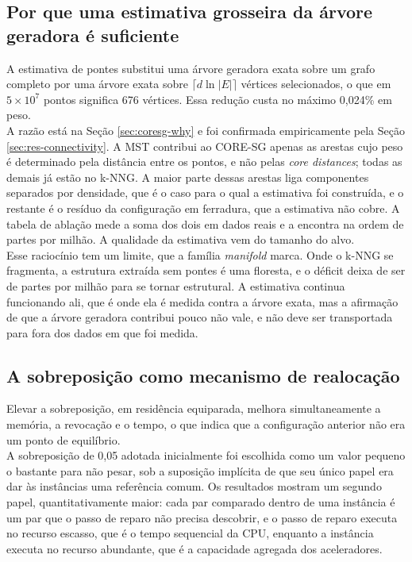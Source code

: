 \subsection{Por que uma estimativa grosseira da árvore geradora é suficiente\label{sec:disc-bridges}}

A estimativa de pontes substitui uma árvore geradora exata sobre um grafo completo por uma árvore exata sobre $\lceil d \ln|E| \rceil$ vértices selecionados, o que em $5 \times 10^7$ pontos significa 676 vértices. Essa redução custa no máximo 0,024\% em peso.\\

A razão está na Seção \ref{sec:coresg-why} e foi confirmada empiricamente pela Seção \ref{sec:res-connectivity}. A \ac{MST} contribui ao \ac{CORE-SG} apenas as arestas cujo peso é determinado pela distância entre os pontos, e não pelas \textit{core distances}; todas as demais já estão no \ac{k-NNG}. A maior parte dessas arestas liga componentes separados por densidade, que é o caso para o qual a estimativa foi construída, e o restante é o resíduo da configuração em ferradura, que a estimativa não cobre. A tabela de ablação mede a soma dos dois em dados reais e a encontra na ordem de partes por milhão. A qualidade da estimativa vem do tamanho do alvo.\\

Esse raciocínio tem um limite, que a família \textit{manifold} marca. Onde o \ac{k-NNG} se fragmenta, a estrutura extraída sem pontes é uma floresta, e o déficit deixa de ser de partes por milhão para se tornar estrutural. A estimativa continua funcionando ali, que é onde ela é medida contra a árvore exata, mas a afirmação de que a árvore geradora contribui pouco não vale, e não deve ser transportada para fora dos dados em que foi medida.\\

\subsection{A sobreposição como mecanismo de realocação\label{sec:disc-overlap}}

Elevar a sobreposição, em residência equiparada, melhora simultaneamente a memória, a revocação e o tempo, o que indica que a configuração anterior não era um ponto de equilíbrio.\\

A sobreposição de 0,05 adotada inicialmente foi escolhida como um valor pequeno o bastante para não pesar, sob a suposição implícita de que seu único papel era dar às instâncias uma referência comum. Os resultados mostram um segundo papel, quantitativamente maior: cada par comparado dentro de uma instância é um par que o passo de reparo não precisa descobrir, e o passo de reparo executa no recurso escasso, que é o tempo sequencial da \ac{CPU}, enquanto a instância executa no recurso abundante, que é a capacidade agregada dos aceleradores.\\

